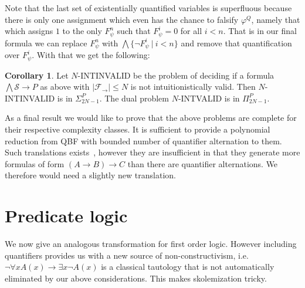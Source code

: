 \documentclass[a4paper,12pt]{report}
\theoremstyle{definition}
\theoremstyle{definition}
\newtheorem{corollary}[theorem]{Corollary}
\theoremstyle{definition}
\theoremstyle{definition}
\theoremstyle{definition}
\theoremstyle{definition}
\theoremstyle{definition}
\begin{document}
	Note that the last set of existentially quantified variables is superfluous because there is only one assignment which even has the chance to falsify $\varphi^Q$, namely that which assigns $1$ to the only $F_\psi^n$ such that $F_\psi^i = 0$ for all $i < n$. That is in our final formula we can replace $F_\psi^n$ with $\bigwedge\{\neg F_\psi^i\:|\:i < n\}$ and remove that quantification over $F_\psi^i$. With that we get the following:
	
	\begin{corollary}
		Let $N$-INTINVALID be the problem of deciding if a formula $\bigwedge \mathcal S\to P$ as above with $|\mathcal F_\to|\leq N$ is not intuitionistically valid. Then $N$-INTINVALID is in $\Sigma_{2N-1}^P$. The dual problem $N$-INTVALID is in $\Pi_{2N-1}^P$.
	\end{corollary}

	As a final result we would like to prove that the above problems are complete for their respective complexity classes. It is sufficient to provide a polynomial reduction from QBF with bounded number of quantifier alternation to them. Such translations exists~\cite{statman1979intuitionistic,vsvejdar2003polynomial}, however they are insufficient in that they generate more formulas of form $(A\to B)\to C$ than there are quantifier alternations. We therefore would need a slightly new translation.

	\section{Predicate logic}
	
	We now give an analogous transformation for first order logic. However including quantifiers provides us with a new source of non-constructivism, i.e. $\neg\forall x A(x)\to \exists x\neg A(x)$ is a classical tautology that is not automatically eliminated by our above considerations. This makes skolemization tricky.
	
\end{document}

